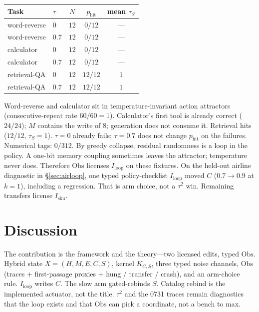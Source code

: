 \documentclass{article}
\begin{document}
\begin{center}
\small
\begin{tabular}{llccc}
\toprule
Task & \(\tau\) & \(N\) & \(p_{\mathrm{hit}}\) & mean \(\tau_S\) \\
\midrule
word-reverse & \(0\) & \(12\) & \(0/12\) & --- \\
word-reverse & \(0.7\) & \(12\) & \(0/12\) & --- \\
calculator & \(0\) & \(12\) & \(0/12\) & --- \\
calculator & \(0.7\) & \(12\) & \(0/12\) & --- \\
retrieval-QA & \(0\) & \(12\) & \(12/12\) & \(1\) \\
retrieval-QA & \(0.7\) & \(12\) & \(12/12\) & \(1\) \\
\bottomrule
\end{tabular}
\end{center}

Word-reverse and calculator sit in temperature-invariant action attractors (consecutive-repeat rate \(60/60=1\)). Calculator's first tool is already correct (\(24/24\)); \(M\) contains the write of \(8\); generation does not consume it. Retrieval hits (\(12/12\), \(\tau_S=1\)). \(\tau=0\) already fails; \(\tau=0.7\) does not change \(p_{\mathrm{hit}}\) on the failures. Numerical tags: \(0/312\). By greedy collapse, residual randomness is a loop in the policy. A one-bit memory coupling sometimes leaves the attractor; temperature never does. Therefore \(\mathrm{Obs}\) licenses \(I_{\mathrm{loop}}\) on these fixtures. On the held-out airline diagnostic in \S\ref{sec:airloop}, one typed policy-checklist \(I_{\mathrm{loop}}\) moved \(C\) (\(0.7\to 0.9\) at \(k=1\)), including a regression. That is arm choice, not a \(\tau^2\) win. Remaining transfers license \(I_{\mathrm{sku}}\).

\section{Discussion}

The contribution is the framework and the theory---two licensed edits, typed \(\mathrm{Obs}\). Hybrid state \(X=(H,M,E,C,S)\), kernel \(K_{C,S}\), three typed noise channels, \(\mathrm{Obs}\) (traces + first-passage proxies + hung / transfer / crash), and an arm-choice rule. \(I_{\mathrm{loop}}\) writes \(C\). The slow arm gated-rebinds \(S\). Catalog rebind is the implemented actuator, not the title. \(\tau^2\) and the 0731 traces remain diagnostics that the loop exists and that \(\mathrm{Obs}\) can pick a coordinate, not a bench to max.
\end{document}
